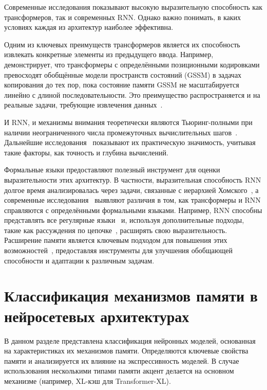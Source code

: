 Современные исследования показывают высокую выразительную способность как трансформеров, так и современных RNN. Однако важно понимать, в каких условиях каждая из архитектур наиболее эффективна.  

Одним из ключевых преимуществ трансформеров является их способность извлекать конкретные элементы из предыдущего ввода. Например, ~\cite{jelassi2024repeat} демонстрирует, что трансформеры с определёнными позиционными кодировками превосходят обобщённые модели пространств состояний (GSSM) в задачах копирования до тех пор, пока состояние памяти GSSM не масштабируется линейно с длиной последовательности. Это преимущество распространяется и на реальные задачи, требующие извлечения данных~\cite{park2024can, waleffe2024empirical}.  

И RNN, и механизмы внимания теоретически являются Тьюринг-полными при наличии неограниченного числа промежуточных вычислительных шагов~\cite{chen2017recurrent, perez2019turing, perez2021attention, siegelmann1994analog}. Дальнейшие исследования~\cite{deletang2022neural, strobl2024formal} показывают их практическую значимость, учитывая такие факторы, как точность и глубина вычислений.  

Формальные языки предоставляют полезный инструмент для оценки выразительности этих архитектур. В частности, выразительная способность RNN долгое время анализировалась через задачи, связанные с иерархией Хомского~\cite{gers2001lstm, deletang2022neural}, а современные исследования~\cite{strobl2024formal} выявляют различия в том, как трансформеры и RNN справляются с определёнными формальными языками. Например, RNN способны представлять все регулярные языки~\cite{korsky2019computational} и, используя дополнительные подходы, такие как рассуждения по цепочке~\cite{merrill2023expresssive}, расширять свою выразительность. Расширение памяти является ключевым подходом для повышения этих возможностей~\cite{das1992learning, suzgun2019memory, deletang2022neural}, предоставляя инструменты для улучшения обобщающей способности и адаптации к различным задачам.  

\section{Классификация механизмов памяти в нейросетевых архитектурах}
\label{sec:taxonomy}  

В данном разделе представлена классификация нейронных моделей, основанная на характеристиках их механизмов памяти. Определяются ключевые свойства памяти и анализируется их влияние на экспрессивность моделей. В случае использования несколькими типами памяти акцент делается на основном механизме (например, XL-кэш для Transformer-XL).  

